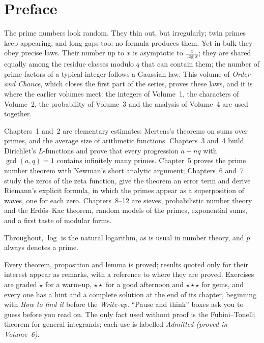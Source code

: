 \chapter*{Preface}
The prime numbers look random. They thin out, but irregularly; twin primes keep appearing, and long gaps too; no
formula produces them. Yet in bulk they obey precise laws. Their number up to $x$ is asymptotic to
$\frac x{\log x}$; they are shared equally among the residue classes modulo $q$ that can contain them; the number of
prime factors of a typical integer follows a Gaussian law. This volume of \emph{Order and Chance}, which closes the
first part of the series, proves these laws, and it is where the earlier volumes meet: the integers of Volume~1, the
characters of Volume~2, the probability of Volume~3 and the analysis of Volume~4 are used together.

Chapters~1 and~2 are elementary estimates: Mertens's theorems on sums over primes, and the average size of
arithmetic functions. Chapters~3 and~4 build Dirichlet's $L$-functions and prove that every progression $a+nq$ with
$\gcd(a,q)=1$ contains infinitely many primes. Chapter~5 proves the prime number theorem with Newman's short analytic
argument; Chapters~6 and~7 study the zeros of the zeta function, give the theorem an error term and derive
Riemann's explicit formula, in which the primes appear as a superposition of waves, one for each zero. Chapters~8--12
are sieves, probabilistic number theory and the Erd\H{o}s--Kac theorem, random models of the primes, exponential sums,
and a first taste of modular forms.

Throughout, $\log$ is the natural logarithm, as is usual in number theory, and $p$ always denotes a prime.

Every theorem, proposition and lemma is proved; results quoted only for their interest appear as remarks, with a
reference to where they are proved. Exercises are graded \textbf{$\star$} for a warm-up, \textbf{$\star\star$} for a good
afternoon and \textbf{$\star\star\star$} for gems, and every one has a hint and a complete solution at the end of its
chapter, beginning with \emph{How to find it} before the \emph{Write-up}. ``Pause and think'' boxes ask you to guess
before you read on. The only fact used without proof is the Fubini--Tonelli theorem for general integrands; each use is
labelled \emph{Admitted (proved in Volume~6)}.
